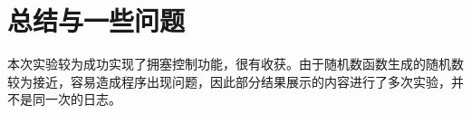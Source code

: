 \documentclass[UTF8,a4paper,10pt]{ctexart}
\begin{document}
\section{总结与一些问题}
本次实验较为成功实现了拥塞控制功能，很有收获。由于随机数函数生成的随机数较为接近，容易造成程序出现问题，因此部分结果展示的内容进行了多次实验，并不是同一次的日志。
\end{document}
